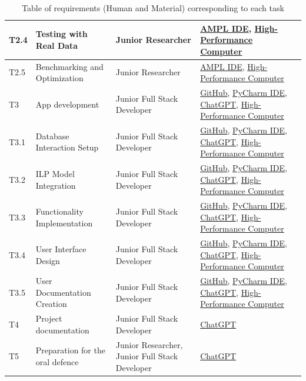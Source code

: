 \begin{landscape}
\begin{table}[!ht]
\begin{tabular}{|l|p{5cm}|l|l|}
        T2.4 & Testing with Real Data & Junior Researcher & \hyperlink{ht:amplide}{AMPL IDE}, \hyperlink{ht:hpc}{High-Performance Computer} \\ \hline
        T2.5 & Benchmarking and Optimization & Junior Researcher & \hyperlink{ht:amplide}{AMPL IDE}, \hyperlink{ht:hpc}{High-Performance Computer} \\ \hline
        \rowcolor{black!15}
        T3 & App development & Junior Full Stack Developer & \hyperlink{ht:github}{GitHub}, \hyperlink{ht:pycharm}{PyCharm IDE}, \hyperlink{ht:chatgpt}{ChatGPT}, \hyperlink{ht:hpc}{High-Performance Computer} \\ \hline
        T3.1 & Database Interaction Setup & Junior Full Stack Developer & \hyperlink{ht:github}{GitHub}, \hyperlink{ht:pycharm}{PyCharm IDE}, \hyperlink{ht:chatgpt}{ChatGPT}, \hyperlink{ht:hpc}{High-Performance Computer} \\ \hline
        T3.2 & ILP Model Integration & Junior Full Stack Developer & \hyperlink{ht:github}{GitHub}, \hyperlink{ht:pycharm}{PyCharm IDE}, \hyperlink{ht:chatgpt}{ChatGPT}, \hyperlink{ht:hpc}{High-Performance Computer} \\ \hline
        T3.3 & Functionality Implementation & Junior Full Stack Developer & \hyperlink{ht:github}{GitHub}, \hyperlink{ht:pycharm}{PyCharm IDE}, \hyperlink{ht:chatgpt}{ChatGPT}, \hyperlink{ht:hpc}{High-Performance Computer} \\ \hline
        T3.4 & User Interface Design & Junior Full Stack Developer & \hyperlink{ht:github}{GitHub}, \hyperlink{ht:pycharm}{PyCharm IDE}, \hyperlink{ht:chatgpt}{ChatGPT}, \hyperlink{ht:hpc}{High-Performance Computer} \\ \hline
        T3.5 & User Documentation Creation & Junior Full Stack Developer & \hyperlink{ht:github}{GitHub}, \hyperlink{ht:pycharm}{PyCharm IDE}, \hyperlink{ht:chatgpt}{ChatGPT}, \hyperlink{ht:hpc}{High-Performance Computer} \\ \hline
        \rowcolor{black!15}
        T4 & Project documentation & Junior Full Stack Developer & \hyperlink{ht:chatgpt}{ChatGPT} \\ \hline
        \rowcolor{black!15}
        T5 & Preparation for the oral defence & Junior Researcher, Junior Full Stack Developer & \hyperlink{ht:chatgpt}{ChatGPT} \\ \hline
    \end{tabular}
    \caption{Table of requirements (Human and Material) corresponding to each task}
    \label{tab:requirementsHRMat}
\end{table}
\end{landscape}


